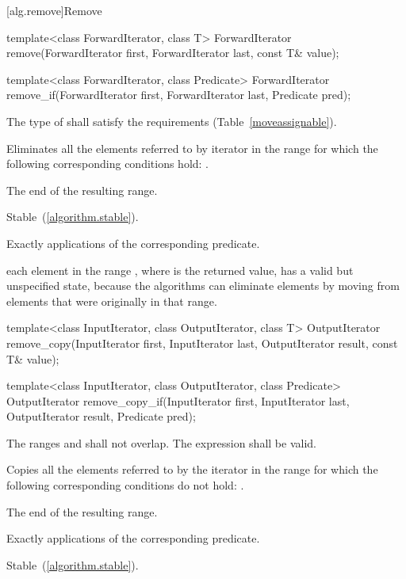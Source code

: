[alg.remove]{Remove}

%
%
\begin{itemdecl}
template<class ForwardIterator, class T>
  ForwardIterator remove(ForwardIterator first, ForwardIterator last,
                         const T& value);

template<class ForwardIterator, class Predicate>
  ForwardIterator remove_if(ForwardIterator first, ForwardIterator last,
                            Predicate pred);
\end{itemdecl}

\begin{itemdescr}
\pnum
\requires
The type of
shall satisfy the 
requirements (Table~\ref{moveassignable}).

\pnum
\effects
Eliminates all the elements referred to by iterator
in the range 
for which the following corresponding conditions hold:
.

\pnum
\returns
The end of the resulting range.

\pnum
\remarks Stable~(\ref{algorithm.stable}).

\pnum
\complexity
Exactly
applications of the corresponding predicate.

\pnum
\realnote each element in the range , where  is
the returned value, has a valid but unspecified state, because the algorithms
can eliminate elements by moving from elements that were originally
in that range.
\end{itemdescr}

%
%
\begin{itemdecl}
template<class InputIterator, class OutputIterator, class T>
  OutputIterator
    remove_copy(InputIterator first, InputIterator last,
                OutputIterator result, const T& value);

template<class InputIterator, class OutputIterator, class Predicate>
  OutputIterator
    remove_copy_if(InputIterator first, InputIterator last,
                   OutputIterator result, Predicate pred);
\end{itemdecl}

\begin{itemdescr}
\pnum
\requires
The ranges
and
shall not overlap. The expression  shall be valid.

\pnum
\effects
Copies all the elements referred to by the iterator
in the range
for which the following corresponding conditions do not hold:
.

\pnum
\returns
The end of the resulting range.

\pnum
\complexity
Exactly
applications of the corresponding predicate.

\pnum
\remarks Stable~(\ref{algorithm.stable}).
\end{itemdescr}

